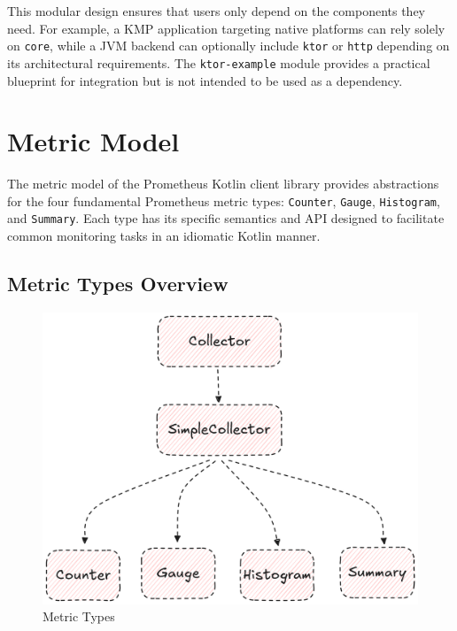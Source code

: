 This modular design ensures that users only depend on the components they need.
For example, a \ac{KMP} application targeting native platforms can rely solely on \texttt{core}, while a JVM backend
can optionally include \texttt{ktor} or \texttt{http} depending on its architectural requirements.
The \texttt{ktor-example} module provides a practical blueprint for integration but is not intended to be used as a dependency.


\section{Metric Model}\label{sec:metric-model}

The metric model of the Prometheus Kotlin client library provides abstractions for the four fundamental Prometheus metric types: \texttt{Counter}, \texttt{Gauge}, \texttt{Histogram}, and \texttt{Summary}. Each type has its specific semantics and API designed to facilitate common monitoring tasks in an idiomatic Kotlin manner.

\subsection{Metric Types Overview}\label{subsec:metric-types-overview}

\begin{figure}[H]
    \centering
    \includegraphics[width=\linewidth, keepaspectratio]{./figures/metric_types}
    \caption{Metric Types}
\end{figure}


